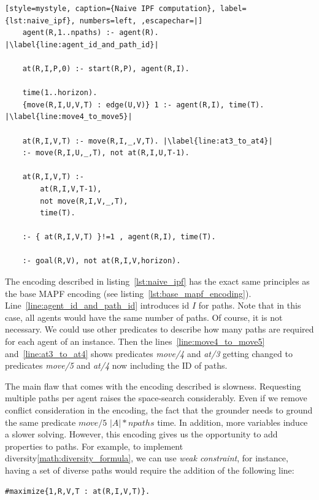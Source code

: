 \begin{minipage}[H]{\linewidth}
\begin{lstlisting}[style=mystyle, caption={Naive IPF computation}, label={lst:naive_ipf}, numbers=left, ,escapechar=|]
    agent(R,1..npaths) :- agent(R). |\label{line:agent_id_and_path_id}|
    
    at(R,I,P,0) :- start(R,P), agent(R,I).

    time(1..horizon).
    {move(R,I,U,V,T) : edge(U,V)} 1 :- agent(R,I), time(T). |\label{line:move4_to_move5}|

    at(R,I,V,T) :- move(R,I,_,V,T). |\label{line:at3_to_at4}|
    :- move(R,I,U,_,T), not at(R,I,U,T-1).

    at(R,I,V,T) :- 
        at(R,I,V,T-1), 
        not move(R,I,V,_,T),
        time(T).

    :- { at(R,I,V,T) }!=1 , agent(R,I), time(T). 

    :- goal(R,V), not at(R,I,V,horizon).
\end{lstlisting}
\end{minipage}

The encoding described in listing~\ref{lst:naive_ipf} has the exact same principles as the base MAPF encoding (see listing~\ref{lst:base_mapf_encoding}). Line~\ref{line:agent_id_and_path_id} introduces id \(I\) for paths. Note that in this case, all agents would have the same number of paths. Of course, it is not necessary. We could use other predicates to describe how many paths are required for each agent of an instance. Then the lines~\ref{line:move4_to_move5} and~\ref{line:at3_to_at4} shows predicates \textit{move/4} and \textit{at/3} getting changed to predicates \textit{move/5} and \textit{at/4} now including the ID of paths.


The main flaw that comes with the encoding described is slowness. Requesting multiple paths per agent raises the space-search considerably. Even if we remove conflict consideration in the encoding, the fact that the grounder needs to ground the same predicate \(move/5\) \(|A| * npaths\) time. In addition, more variables induce a slower solving. 
However, this encoding gives us the opportunity to add properties to paths. For example, to implement diversity\ref{math:diversity_formula}, we can use \textit{weak constraint}, for instance, having a set of diverse paths would require the addition of the following line:

\begin{minipage}[H]{\linewidth}
\begin{lstlisting}[style=mystyle]
    #maximize{1,R,V,T : at(R,I,V,T)}.
\end{lstlisting}
\end{minipage}

